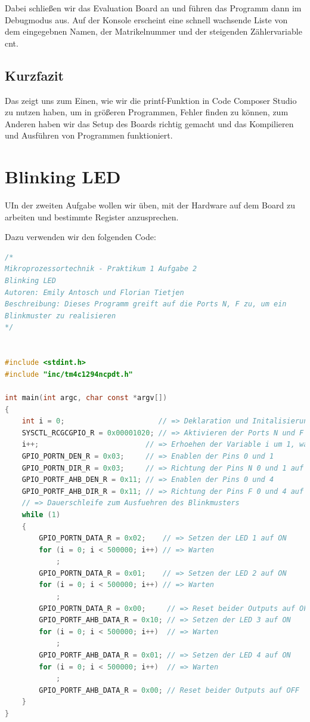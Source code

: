\documentclass{article}
\begin{document}
Dabei schließen wir das Evaluation Board an und führen das Programm dann im Debugmodus aus.
Auf der Konsole erscheint eine schnell wachsende Liste von dem eingegebnen Namen, der Matrikelnummer und der steigenden Zählervariable cnt. 
\subsection{Kurzfazit}
Das zeigt uns zum Einen, wie wir die 
printf-Funktion in Code Composer Studio zu nutzen haben, um in größeren Programmen, Fehler finden zu können, zum Anderen haben wir das Setup des Boards richtig gemacht und das Kompilieren und Ausführen von Programmen funktioniert.


\newpage

\section{Blinking LED}


\begin{task}
  UIn der zweiten Aufgabe wollen wir üben, mit der Hardware auf dem Board zu arbeiten und bestimmte Register anzusprechen.
\end{task}

Dazu verwenden wir den folgenden Code:

\begin{lstlisting}[language=c, caption={Code für das Blinkmuster}, captionpos=b]
/*
Mikroprozessortechnik - Praktikum 1 Aufgabe 2
Blinking LED
Autoren: Emily Antosch und Florian Tietjen
Beschreibung: Dieses Programm greift auf die Ports N, F zu, um ein
Blinkmuster zu realisieren
*/


#include <stdint.h>
#include "inc/tm4c1294ncpdt.h"

int main(int argc, char const *argv[])
{
    int i = 0;                      // => Deklaration und Initalisierung der Warte-Variable i
    SYSCTL_RCGCGPIO_R = 0x00001020; // => Aktivieren der Ports N und F
    i++;                         // => Erhoehen der Variable i um 1, warten auf Clock
    GPIO_PORTN_DEN_R = 0x03;     // => Enablen der Pins 0 und 1
    GPIO_PORTN_DIR_R = 0x03;     // => Richtung der Pins N 0 und 1 auf Ausgang
    GPIO_PORTF_AHB_DEN_R = 0x11; // => Enablen der Pins 0 und 4
    GPIO_PORTF_AHB_DIR_R = 0x11; // => Richtung der Pins F 0 und 4 auf Ausgang
    // => Dauerschleife zum Ausfuehren des Blinkmusters
    while (1)
    {
        GPIO_PORTN_DATA_R = 0x02;    // => Setzen der LED 1 auf ON
        for (i = 0; i < 500000; i++) // => Warten
            ;
        GPIO_PORTN_DATA_R = 0x01;    // => Setzen der LED 2 auf ON
        for (i = 0; i < 500000; i++) // => Warten
            ;
        GPIO_PORTN_DATA_R = 0x00;     // => Reset beider Outputs auf OFF
        GPIO_PORTF_AHB_DATA_R = 0x10; // => Setzen der LED 3 auf ON
        for (i = 0; i < 500000; i++)  // => Warten
            ;
        GPIO_PORTF_AHB_DATA_R = 0x01; // => Setzen der LED 4 auf ON
        for (i = 0; i < 500000; i++)  // => Warten
            ;
        GPIO_PORTF_AHB_DATA_R = 0x00; // Reset beider Outputs auf OFF
    }
}


\end{lstlisting}
\end{document}
